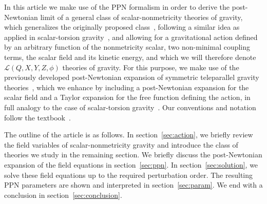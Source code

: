 \documentclass[notitlepage,a4paper,aps,prd,onecolumn,superscriptaddress,nofootinbib,groupedaddress,longbibliography]{revtex4-2}
\begin{document}
In this article we make use of the PPN formalism in order to derive the post-Newtonian limit of a general class of scalar-nonmetricity theories of gravity, which generalizes the originally proposed class~\cite{Jarv:2018bgs}, following a similar idea as applied in scalar-torsion gravity~\cite{Hohmann:2018dqh}, and allowing for a gravitational action defined by an arbitrary function of the nonmetricity scalar, two non-minimal coupling terms, the scalar field and its kinetic energy, and which we will therefore denote $\mathcal{L}(Q,X,Y,Z,\phi)$ theories of gravity. For this purpose, we make use of the previously developed post-Newtonian expansion of symmetric teleparallel gravity theories~\cite{Flathmann:2021khc,Hohmann:2021zel}, which we enhance by including a post-Newtonian expansion for the scalar field and a Taylor expansion for the free function defining the action, in full analogy to the case of scalar-torsion gravity~\cite{Flathmann:2019khc}. Our conventions and notation follow the textbook~\cite{Will:1993ns}.

The outline of the article is as follows. In section~\ref{sec:action}, we briefly review the field variables of scalar-nonmetricity gravity and introduce the class of theories we study in the remaining section. We briefly discuss the post-Newtonian expansion of the field equations in section~\ref{sec:ppn}. In section~\ref{sec:solution}, we solve these field equations up to the required perturbation order. The resulting PPN parameters are shown and interpreted in section~\ref{sec:param}. We end with a conclusion in section~\ref{sec:conclusion}.
\end{document}
